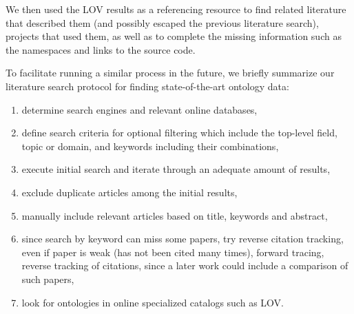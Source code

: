 We then used the LOV results as a referencing resource to find related literature that described them (and  possibly escaped the previous literature search), projects that used them,
as well as to complete the missing information such as the namespaces and links to the source code. 

To facilitate running a similar process in the future, we briefly summarize our literature search protocol for finding state-of-the-art ontology data:

\begin{enumerate}
    \item determine search engines and relevant online databases, %
    \item define search criteria for optional filtering which include the top-level field, topic or domain, and keywords including their combinations,
    \item execute initial search and iterate through an adequate amount of results,
    \item exclude duplicate articles among the initial results,
    \item manually include relevant articles based on title, keywords and abstract,
    \item since search by keyword can miss some papers, try reverse citation tracking, even if paper is weak (has not been cited many times), forward tracing, reverse tracking of citations, since a later work could include a comparison of such papers,
    \item look for ontologies in online specialized catalogs such as LOV.
\end{enumerate}


